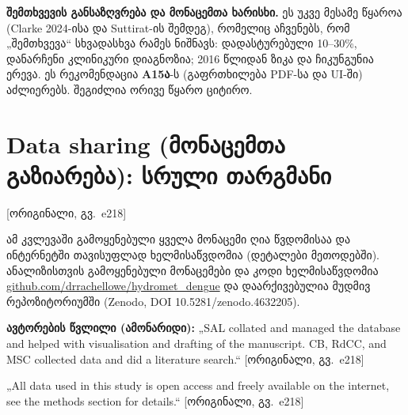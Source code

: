 \documentclass[11pt,a4paper]{article}
\newcommand{\pg}[1]{{\small\color{gray}[ორიგინალი, გვ.~#1]}}
\begin{document}
\begin{alarm}
\textbf{შემთხვევის განსაზღვრება და მონაცემთა ხარისხი.} ეს უკვე მესამე წყაროა (Clarke 2024-ისა და Suttirat-ის შემდეგ), რომელიც
აჩვენებს, რომ „შემთხვევა“ სხვადასხვა რამეს ნიშნავს: დადასტურებული 10--30\%, დანარჩენი კლინიკური დიაგნოზია; 2016 წლიდან ზიკა
და ჩიკუნგუნია ერევა. ეს რეკომენდაცია \textbf{A15ა}-ს (გაფრთხილება PDF-სა და UI-ში) აძლიერებს. შეგიძლია ორივე წყარო ციტირო.
\end{alarm}

\section{Data sharing (მონაცემთა გაზიარება): სრული თარგმანი} \pg{e218}

ამ კვლევაში გამოყენებული ყველა მონაცემი ღია წვდომისაა და ინტერნეტში თავისუფლად ხელმისაწვდომია (დეტალები მეთოდებში).
ანალიზისთვის გამოყენებული მონაცემები და კოდი ხელმისაწვდომია
\href{https://github.com/drrachellowe/hydromet_dengue}{github.com/drrachellowe/hydromet\_dengue} და დაარქივებულია მუდმივ
რეპოზიტორიუმში (Zenodo, DOI 10.5281/zenodo.4632205).

\textbf{ავტორების წვლილი (ამონარიდი):} „SAL collated and managed the database and helped with visualisation and drafting of the
manuscript. CB, RdCC, and MSC collected data and did a literature search.“ \pg{e218}

\begin{citat}
„All data used in this study is open access and freely available on the internet, see the methods section for details.“ \pg{e218}
\end{citat}
\end{document}

